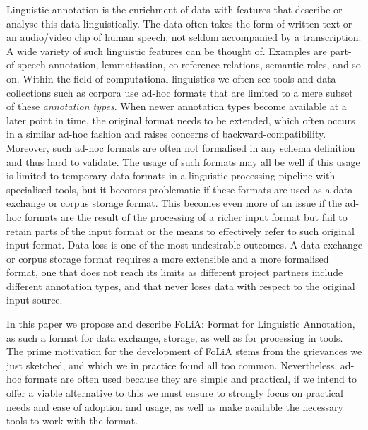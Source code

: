 \documentclass[a4paper,10pt,twoside]{article}
\begin{document}
Linguistic annotation is the enrichment of data with features that describe or
analyse this data linguistically. The data often takes the form of written text
or an audio/video clip of human speech, not seldom accompanied by a
transcription. A wide variety of such linguistic features can be thought of.
Examples are part-of-speech annotation, lemmatisation, co-reference relations,
semantic roles, and so on. Within the field of computational linguistics we
often see tools and data collections such as corpora use ad-hoc formats that
are limited to a mere subset of these \emph{annotation types}. When newer
annotation types become available at a later point in time, the original format
needs to be extended, which often occurs in a similar ad-hoc fashion and raises
concerns of backward-compatibility. Moreover, such ad-hoc formats are often not
formalised in any schema definition and thus hard to validate. The usage of
such formats may all be well if this usage is limited to temporary data formats
in a linguistic processing pipeline with specialised tools, but it becomes
problematic if these formats are used as a data exchange or corpus storage
format. This becomes even more of an issue if the ad-hoc formats are the result
of the processing of a richer input format but fail to retain parts of the
input format or the means to effectively refer to such original input format.
Data loss is one of the most undesirable outcomes. A data exchange or corpus
storage format requires a more extensible and a more formalised format, one
that does not reach its limits as different project partners include different
annotation types, and that never loses data with respect to the original input
source.

In this paper we propose and describe FoLiA: Format for Linguistic Annotation,
as such a format for data exchange, storage, as well as for processing in
tools. The prime motivation for the development of FoLiA stems from the
grievances we just sketched, and which we in practice found all too common.
Nevertheless, ad-hoc formats are often used because they are simple and
practical, if we intend to offer a viable alternative to this we must ensure to
strongly focus on practical needs and ease of adoption and usage, as well as
make available the necessary tools to work with the format. 
\end{document}
